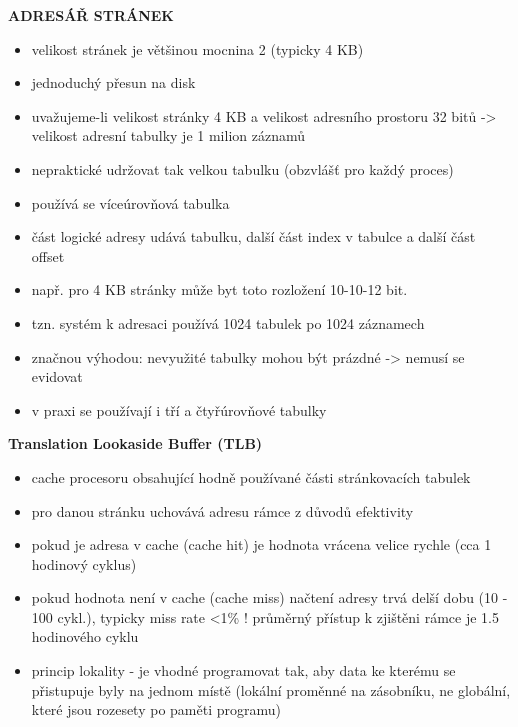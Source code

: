 \documentclass[10pt,a4paper]{article}
\begin{document}
\textbf{ADRESÁŘ STRÁNEK}
\begin{itemize}
	\item velikost stránek je většinou mocnina 2 (typicky 4 KB)
	\item jednoduchý přesun na disk
	\item uvažujeme-li velikost stránky 4 KB a velikost adresního prostoru 32 bitů -> velikost adresní
tabulky je 1 milion záznamů
	\item nepraktické udržovat tak velkou tabulku (obzvlášť pro každý proces)
	\item používá se víceúrovňová tabulka
	\item část logické adresy udává tabulku, další část index v tabulce a další část offset
	\item např. pro 4 KB stránky může byt toto rozložení 10-10-12 bit.
	\item tzn. systém k adresaci používá 1024 tabulek po 1024 záznamech
	\item značnou výhodou: nevyužité tabulky mohou být prázdné -> nemusí se evidovat
	\item v praxi se používají i tří a čtyřúrovňové tabulky
\end{itemize}

\textbf{Translation Lookaside Buffer (TLB)}
\begin{itemize}
	\item cache procesoru obsahující hodně používané části stránkovacích tabulek
	\item pro danou stránku uchovává adresu rámce z důvodů efektivity
	\item pokud je adresa v cache (cache hit) je hodnota vrácena velice rychle (cca 1 hodinový cyklus)
	\item pokud hodnota není v cache (cache miss) načtení adresy trvá delší dobu (10 - 100 cykl.),
typicky miss rate <1\% ! průměrný přístup k zjištěni rámce je 1.5 hodinového cyklu
	\item princip lokality - je vhodné programovat tak, aby data ke kterému se přistupuje byly na
jednom místě (lokální proměnné na zásobníku, ne globální, které jsou rozesety po paměti
programu)
\end{itemize}
\end{document}
